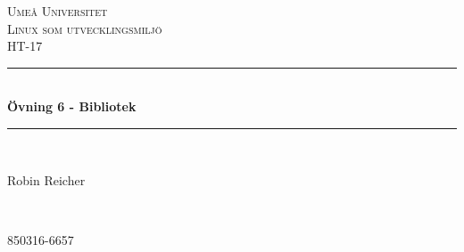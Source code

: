 \documentclass[11pt]{article}
\begin{document}

\begin{titlepage} %
	\newcommand{\HRule}{\rule{\linewidth}{0.5mm}} %

	\center %


	\textsc{\LARGE Umeå Universitet}\\[1.5cm] %

	\textsc{\Large Linux som utvecklingsmiljö}\\[0.5cm] %

	\textsc{\large HT-17}\\[0.5cm] %


	\HRule\\[0.4cm]

	{\huge\bfseries Övning 6 - Bibliotek}\\[0.4cm] %

	\HRule\\[1.5cm]


	\begin{minipage}{0.4\textwidth}
		\begin{flushleft}
			\large
			Robin Reicher
		\end{flushleft}
	\end{minipage}
	~
	\begin{minipage}{0.4\textwidth}
		\begin{flushright}
			\large
			850316-6657
		\end{flushright}
	\end{minipage}



\end{titlepage}
\end{document}
